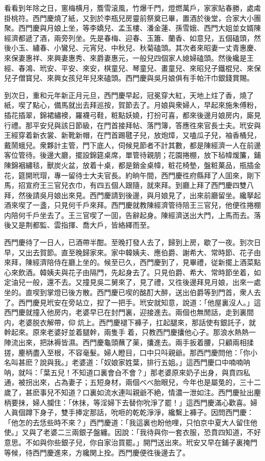 看看到年除之日，窻梅横月，簷雪滚風，竹爆千門，燈燃萬戶，家家貼春勝，處䖏掛桃符。西門慶燒了紙，又到於李瓶兒房靈前祭奠已畢，置酒於後堂，合家大小團聚。西門慶與月娘上坐，等李嬌兒、孟玉樓、潘金蓮、孫雪娥、西門大姐並女婿陳經濟都遞了酒，兩旁列坐。先是春梅、迎春、玉簫、蘭香、如意兒，五個磕頭，然後小玉、繡春、小鸞兒、元宵兒、中秋兒、秋菊磕頭。其次者來昭妻一丈青惠慶、來保妻惠祥、來興妻惠秀、來爵妻惠元，一般兒四個家人媳婦磕頭。然後纔是王經、春鴻、玳安、平安、來安，棋童兒、琴童兒、畫童兒、來昭兒子鐵棍兒、來保兒子僧寳兒、來興女孩兒年兒來磕頭。西門慶與吳月娘俱有手帕汗巾銀錢賞賜。

到次日，重和元年新正月元旦，西門慶早起，冠冕穿大紅，天地上炷了香，燒了紙，喫了點心，備馬就出去拜巡按，賀節去了。月娘與衆婦人，早起來施朱傅粉，插花插翠，錦裙繡襖，羅襪弓鞋，粧點妖嬈，打扮可喜，都來後邊月娘房内，廝見行禮。那平安兒與該日節級，在門首接拜帖、落門簿，答應徃來官長士夫。玳安與王經穿着新衣裳、新靴新帽，在門首踢毽子兒，放炮𤍤，又嗑瓜子兒，袖香桶兒，戴鬧蛾兒。衆夥計主管，門下底人，伺候見節者不計其數，都是陳經濟一人在前邊客位管待。後邊大廳，擺設錦筵桌席，單管待親朋；花園捲棚，放下毡幃煖簾，鋪陳錦裀繡毯，獸炭火盆，放着十桌，都是銷金桌幃，粧花椅墊，盤粧菓品，瓶插金花，筵開玳瑁，專一留待士大夫官長。約晌午間，西門慶徃府縣拜了人囬來，剛下馬，招宣府王三官兒衣巾，有四五個人跟隨，就來拜。到廳上拜了西門慶四雙八拜，然後請吳月娘出來見。西門慶請到後邊，與月娘見了，出來前廳留坐。纔拏起酒來喫了一盞，只見何千戶來拜。西門慶就教陳經濟管待陪王三官兒，他便徃捲棚内陪何千戶坐去了。王三官喫了一囬，告辭起身。陳經濟送出大門，上馬而去。落後又是荆都監、雲指揮、喬大戶，皆絡繹而至。

西門慶待了一日人，已酒帶半酣。至晚打發人去了，歸到上房，歇了一夜。到次日早，又出去賀節。直至晚歸家來。家中韓姨夫、應伯爵、謝希大、常時節、花子由來拜，陳經濟陪侍在廳上坐的。候至已久，西門慶到了，見畢禮，従新擺上酒菜點心來飲酒。韓姨夫與花子由隔門，先起身去了。只見伯爵、希大、常時節坐着，如定油兒一般，還不去。又撞見吳二舅來了，見了禮，又徃後邊拜見月娘，出來一處坐的。直喫到掌燈已後方散。西門慶已喫的酩酊大醉，送出伯爵等到門首，衆人去了。西門慶見玳安在旁站立，揑了一把手。玳安就知意，說道：「他屋裏沒人。」這西門慶就撞入他房内，老婆早已在封門裏，迎接進去。兩個也無閒話，走到裏間内，老婆脱衣解帶，仰𢵞炕上。西門慶褪下褲子，扛起腿來，那話使有銀託子，就幹起來。原來老婆好並着腿幹，兩隻手𢵞着，只教西門慶攮他心子。那浪水熱熱一陣流出來，把牀褥皆濕。西門慶龜頭蘸了薬，攮進去。兩手扳着腰，只顧兩相揉搓，麈柄盡入至根，不容毫髮。婦人瞪目，口中只呌親爺。那西門慶問他：「你小名叫甚麽？說與我。」老婆道：「奴娘家姓葉，排行五姐。」這西門慶口中喃喃呐呐，就呌：「葉五兒！不知道口裏會㒲不會？」那老婆原來奶子出身，與賁四私通，被拐出來，占為妻子；五短身材，兩個べべ胎眼兒，今年也是屬兔的，三十二歲了，甚麽事兒不知道？口裏如流水連叫親爺不絶，情濃一泄如注。西門慶扯出麈柄要抹，婦人攔住：「休抹，等淫婦下去替你吮淨了罷！」這西門慶滿心歡喜。婦人眞個蹲下身子，雙手捧定那話，吮咂的乾乾淨淨，纔繫上褲子。因問西門慶：「他怎的去恁些時不來？」西門慶道：「我這裏也盼他哩，只怕京中夏大人留住他使。」又與了老婆二三兩銀子盤纏。因說：「我待與你一套衣服，恐賁四知道，不好意思。不如與你些銀子兒，你自家治買罷。」開門送出來。玳安又早在鋪子裏掩門等候，待西門慶進來，方纔関上拴。西門慶便徃後邊去了。

